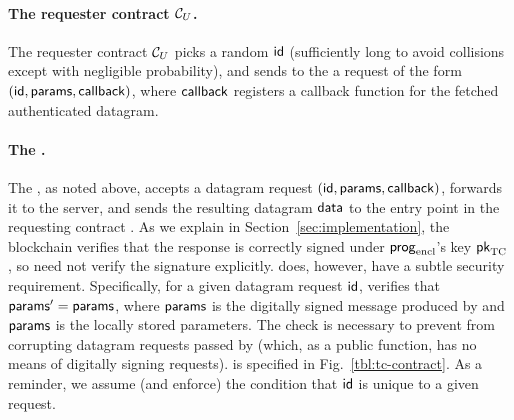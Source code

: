 \paragraph{The requester contract ${\cal C}_U$.}
The requester contract ${\cal C}_U$ picks a
random ${\sf id}$ (sufficiently long to avoid
collisions except with negligible probability),
and sends to the \tcontract \tcont
a request of the form $({\sf id}, {\sf params}, {\sf callback})$,
where ${\sf callback}$ registers a callback function
for the fetched authenticated datagram.  


\paragraph{The \tcontract \tcont.} The \tcontract, as noted above, accepts a datagram request $({\sf id}, {\sf params}, {\sf callback})$, forwards it to the \tc server, and sends the resulting datagram ${\sf data}$ to the entry point \dgcallback in the requesting contract \reqcont. As we explain in Section~\ref{sec:implementation}, the blockchain verifies that the response is correctly signed under ${\sf prog}_{\textrm{encl}}$'s key ${\sf pk}_{\textrm{TC}}$, so \tcont need not verify the signature explicitly. \tc does, however, have a subtle security requirement. Specifically,  for a given datagram request ${\sf id}$, \tcont verifies that ${\sf params}' = {\sf params}$, where ${\sf params}$ is the digitally signed message produced by \engine and ${\sf params}$ is the locally stored parameters. The check is necessary to prevent \relay from corrupting datagram requests passed by \tcont (which, as a public function, has no means of digitally signing requests). \tcont is specified in Fig.~\ref{tbl:tc-contract}. As a reminder, we assume (and enforce) the condition that ${\sf id}$ is unique to a given request.

